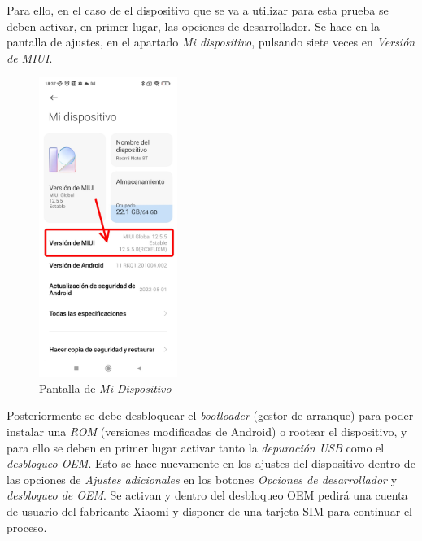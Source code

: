 \documentclass[12pt,a4paper,onecolumn,oneside]{report}
\begin{document}
Para ello, en el caso de el dispositivo que se va a utilizar para esta prueba se deben activar, en primer lugar, las opciones de desarrollador. Se hace en la pantalla de ajustes, en el apartado \textit{Mi dispositivo}, pulsando siete veces en \textit{Versión de MIUI}.


\begin{figure}[H] 
\centering
  \includegraphics[width=0.4\textwidth]{figuras/root1.png}
  \caption[Pantalla de \textit{Mi Dispositivo}]{Pantalla de \textit{Mi Dispositivo}\\
  }
  \label{fig:root1}
\end{figure}

Posteriormente se debe desbloquear el \textit{bootloader} (gestor de arranque) para poder instalar una \textit{ROM} (versiones modificadas de Android) o rootear el dispositivo, y para ello se deben en primer lugar activar tanto la \textit{depuración USB} como el \textit{desbloqueo OEM}. Esto se hace nuevamente en los ajustes del dispositivo dentro de las opciones de \textit{Ajustes adicionales} en los botones \textit{Opciones de desarrollador} y \textit{desbloqueo de OEM}. Se activan y dentro del desbloqueo OEM pedirá una cuenta de usuario del fabricante Xiaomi y disponer de una tarjeta SIM para continuar el proceso.
\end{document}
